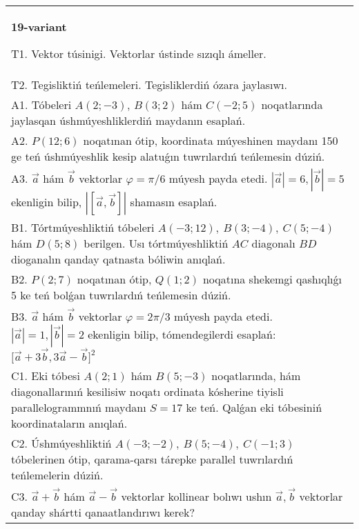 \documentclass{article}
\begin{document}
\begin{tabular}{m{17cm}}
\textbf{19-variant}
\newline

T1. 
Vektor túsinigi. Vektorlar ústinde sızıqlı ámeller.
 \\
T2. 
Tegisliktiń teńlemeleri. Tegisliklerdiń ózara jaylasıwı.
 \\
A1. 
Tóbeleri $A(2;-3)$, $B(3;2)$ hám $C(-2;5)$ 
noqatlarında jaylasqan úshmúyeshliklerdiń maydanın esaplań.
 \\
A2. 
$P(12;6)$ noqatınan ótip, koordinata múyeshinen 
maydanı 150 ge teń úshmúyeshlik kesip alatuǵın tuwrılardıń 
teńlemesin dúziń.
 \\
A3. 
$\overrightarrow{a}$ hám $\overrightarrow{b}$ vektorlar
$\varphi = \pi/6$ múyesh payda etedi.
$|\overrightarrow{a}| = 6,|\overrightarrow{b}| = 5$ ekenligin bilip,
$\left| \left\lbrack \overrightarrow{a},\overrightarrow{b} \right\rbrack \right|$ shamasın esaplań. 
 \\
B1. 
Tórtmúyeshliktiń tóbeleri
\(A(-3;12),\ B(3;-4),\ C(5;-4)\) hám \(D(5;8)\) berilgen. Usı
tórtmúyeshliktiń $AC$ diagonalı $BD$ dioganalın qanday
qatnasta bóliwin anıqlań.
 \\
B2. 
\(P(2;7)\) noqatınan ótip, \(Q(1;2)\) noqatına shekemgi
qashıqlıǵı 5 ke teń bolǵan tuwrılardıń teńlemesin dúziń.
 \\
B3. 
$\vec{a}$ hám $\vec{b}$ vektorlar $\varphi = 2\pi/3$ múyesh payda etedi. $|\vec{a}| = 1,|\vec{b}| = 2$ ekenligin bilip, tómendegilerdi esaplań: 
$\lbrack\overrightarrow{a} + 3\overrightarrow{b},3\overrightarrow{a} - \overrightarrow{b}\rbrack^{2}$
 \\
C1. 
Eki tóbesi \(A(2;1)\) hám \(B(5; - 3)\) noqatlarında, hám
diagonallarınıń kesilisiw noqatı ordinata kósherine tiyisli
parallelogrammnıń maydanı \(S = 17\) ke teń. Qalǵan eki tóbesiniń
koordinataların anıqlań. \\
C2. 
Úshmúyeshliktiń \(A( - 3; - 2),\ B(5; - 4),\ C( - 1;3)\) 
tóbelerinen ótip, qarama-qarsı tárepke parallel tuwrılardıń teńlemelerin
dúziń.
 \\
C3. 
\(\vec{a}+\vec{b}\) hám \(\vec{a} - \vec{b}\) vektorlar kollinear bolıwı ushın \(\vec{a},\vec{b}\) vektorlar qanday shártti qanaatlandırıwı kerek?
 \\

\end{tabular}
\vspace{1cm}
\end{document}
